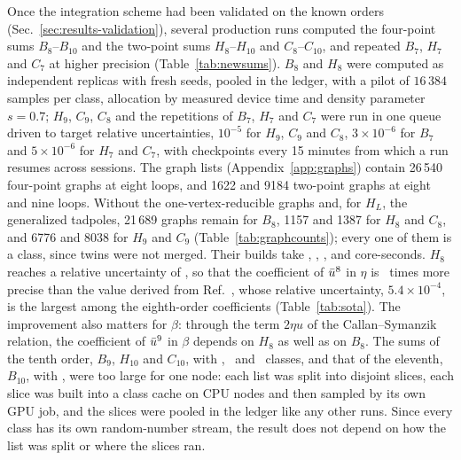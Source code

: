 Once the integration scheme had been validated on the known orders (Sec.~\ref{sec:results-validation}), several
production runs computed the four-point sums $B_8$--$B_{10}$ and the two-point sums $H_8$--$H_{10}$ and
$C_8$--$C_{10}$, and repeated $B_7$, $H_7$ and $C_7$ at higher precision (Table~\ref{tab:newsums}). $B_8$ and $H_8$ were
computed as independent replicas with fresh seeds, pooled in the ledger, with a pilot of $16\,384$ samples per class,
allocation by measured device time and density parameter $s=0.7$; $H_9$, $C_9$, $C_8$ and the repetitions of
$B_7$, $H_7$ and $C_7$ were run in one queue driven to target relative uncertainties, $10^{-5}$ for $H_9$, $C_9$ and
$C_8$, $3\times10^{-6}$ for $B_7$ and $5\times10^{-6}$ for $H_7$ and $C_7$, with checkpoints every 15 minutes from
which a run resumes across sessions. The graph lists (Appendix~\ref{app:graphs}) contain 26\,540 four-point graphs at
eight loops, and 1622 and 9184 two-point graphs at eight and nine loops. Without the one-vertex-reducible graphs and,
for $H_L$, the generalized tadpoles, 21\,689 graphs remain for $B_8$, 1157 and 1387 for $H_8$ and $C_8$, and 6776 and
8038 for $H_9$ and $C_9$ (Table~\ref{tab:graphcounts}); every one of them is a class, since twins were not merged.
Their builds take , , ,  and  core-seconds. $H_8$
reaches a relative uncertainty of \relHeight, so that the coefficient of $\bar u^8$ in $\eta$ is \etaEightGain\ times
more precise than the value derived from Ref.~\cite{Phi4tools2024}, whose relative uncertainty, $5.4\times10^{-4}$, is
the largest among the eighth-order coefficients (Table~\ref{tab:sota}). The improvement also matters for $\beta$:
through the term $2\eta u$ of the Callan--Symanzik relation, the coefficient of $\bar u^{9}$ in $\beta$ depends on
$H_8$ as well as on $B_8$. The sums of the tenth order, $B_9$, $H_{10}$ and $C_{10}$, with \nclBnine, \nclHten\ and
\nclCten\ classes, and that of the eleventh, $B_{10}$, with \nclBten, were too large for one node: each list was split into disjoint slices, each slice was built into a class
cache on CPU nodes and then sampled by its own GPU job, and the slices were pooled in the ledger like any other runs.
Since every class has its own random-number stream, the result does not depend on how the list was split or where
the slices ran.

